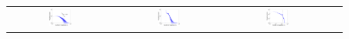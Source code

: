 \documentclass[11pt,a4paper]{book}
\newcommand{\wFourMinusTabular}{0.227}
\begin{document}
\begin{figure}[h!]
\begin{tabular}{c c c c}
    \includegraphics[width=\wFourMinusTabular\textwidth]{img-st/degree.ax.cit-HepPh} &
    \includegraphics[width=\wFourMinusTabular\textwidth]{img-st/degree.u.libimseti} &
    \includegraphics[width=\wFourMinusTabular\textwidth]{img-ns-svg/degree.u.livejournal-groupmemberships.limit} \\

\end{tabular}
\end{figure}
\end{document}
